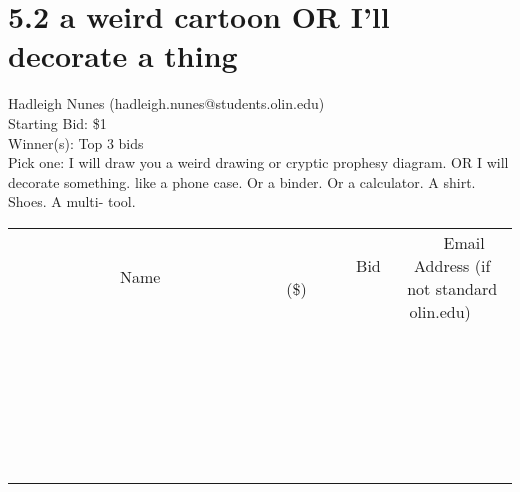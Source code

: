 \documentclass[11pt]{article}
\begin{document}
					\section*{5.2 a weird cartoon OR I'll decorate a thing}
					Hadleigh Nunes (hadleigh.nunes@students.olin.edu) \\
					Starting Bid: \$1 \\
					Winner(s): Top 3 bids \\
					Pick one: I will draw you a weird drawing or cryptic prophesy diagram. OR I will decorate something. like a phone case. Or a binder. Or a calculator. A shirt. Shoes. A multi- tool. \\
					[6ex]
					\begin{tabular}{c c c}
						~~~~~~~~~~~~~Name~~~~~~~~~~~~~ & ~~~~~~~~~Bid (\$)~~~~~~~~~ & ~~~Email Address (if not standard olin.edu)~~~ \\
				
 & & \\
\hline
 & & \\
\hline
 & & \\
\hline
 & & \\
\hline
 & & \\
\hline
 & & \\
\hline
 & & \\
\hline
 & & \\
\hline
 & & \\
\hline
 & & \\
\hline
 & & \\
\hline
 & & \\
\hline
 & & \\
\hline
 & & \\
\hline
 & & \\
\hline
 & & \\
\hline
 & & \\
\hline
 & & \\
\hline
 & & \\
\hline
 & & \\
\hline
 & & \\
\hline
 & & \\
\hline
 & & \\
\hline
 & & \\
\hline
 & & \\
\hline
 & & \\
\hline
					\end{tabular}
					\clearpage
				
\end{document}
